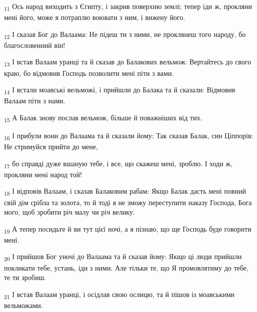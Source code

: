\begin{tcolorbox}
\textsubscript{11} Ось народ виходить з Єгипту, і закрив поверхню землі; тепер іди ж, прокляни мені його, може я потраплю воювати з ним, і вижену його.
\end{tcolorbox}
\begin{tcolorbox}
\textsubscript{12} І сказав Бог до Валаама: Не підеш ти з ними, не проклянеш того народу, бо благословенний він!
\end{tcolorbox}
\begin{tcolorbox}
\textsubscript{13} І встав Валаам уранці та й сказав до Балакових вельмож: Вертайтесь до свого краю, бо відмовив Господь позволити мені піти з вами.
\end{tcolorbox}
\begin{tcolorbox}
\textsubscript{14} І встали моавські вельможі, і прийшли до Балака та й сказали: Відмовив Валаам піти з нами.
\end{tcolorbox}
\begin{tcolorbox}
\textsubscript{15} А Балак знову послав вельмож, більше й поважніших від тих.
\end{tcolorbox}
\begin{tcolorbox}
\textsubscript{16} І прибули вони до Валаама та й сказали йому: Так сказав Балак, син Ціппорів: Не стримуйся прийти до мене,
\end{tcolorbox}
\begin{tcolorbox}
\textsubscript{17} бо справді дуже вшаную тебе, і все, що скажеш мені, зроблю. І ходи ж, прокляни мені народ той!
\end{tcolorbox}
\begin{tcolorbox}
\textsubscript{18} І відповів Валаам, і сказав Балаковим рабам: Якщо Балак дасть мені повний свій дім срібла та золота, то й тоді я не зможу переступити наказу Господа, Бога мого, щоб зробити річ малу чи річ велику.
\end{tcolorbox}
\begin{tcolorbox}
\textsubscript{19} А тепер посидьте й ви тут цієї ночі, а я пізнаю, що ще Господь буде говорити мені.
\end{tcolorbox}
\begin{tcolorbox}
\textsubscript{20} І прийшов Бог уночі до Валаама та й сказав йому: Якщо ці люди прийшли покликати тебе, устань, іди з ними. Але тільки те, що Я промовлятиму до тебе, те ти зробиш.
\end{tcolorbox}
\begin{tcolorbox}
\textsubscript{21} І встав Валаам уранці, і осідлав свою ослицю, та й пішов із моавськими вельможами.
\end{tcolorbox}
